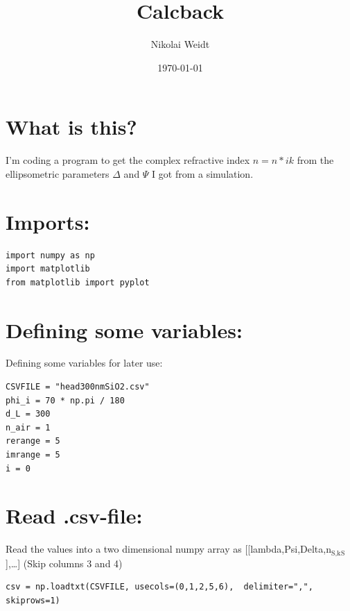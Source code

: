 \documentclass[11pt]{article}
\author{Nikolai Weidt}
\date{\today}
\title{Calcback}
\begin{document}
\maketitle
\tableofcontents



\section{What is this?}
\label{sec:orgb098a27}
I'm coding a program to get the complex refractive index \(n = n * ik\) from the ellipsometric parameters \(\Delta\) and \(\Psi\) I got from a simulation.
\section{Imports:}
\label{sec:org47930ab}
\begin{verbatim}
import numpy as np
import matplotlib
from matplotlib import pyplot
\end{verbatim}

\section{Defining some variables:}
\label{sec:org560e96f}
Defining some variables for later use:

\begin{verbatim}
CSVFILE = "head300nmSiO2.csv"
phi_i = 70 * np.pi / 180
d_L = 300
n_air = 1
rerange = 5
imrange = 5
i = 0
\end{verbatim}

\section{Read .csv-file:}
\label{sec:org4344ab0}
Read the values into a two dimensional numpy array as [[lambda,Psi,Delta,n\(_{\text{S,k}}\)\(_{\text{S}}\)],\ldots{}] (Skip columns 3 and 4)

\begin{verbatim}
csv = np.loadtxt(CSVFILE, usecols=(0,1,2,5,6),  delimiter=",", skiprows=1)
\end{verbatim}
\end{document}
